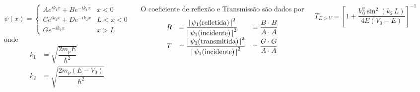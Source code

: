 \documentclass[12pt,brazil,table]{beamer}
\begin{document}
\begin{frame}
\begin{minipage}[b][20ex][t]{\linewidth}
\begin{columns}
      \[
      \psi(x) = \begin{cases}
                  Ae^{ik_1x}+Be^{-ik_1x}& x < 0\\
                  Ce^{ik_2x}+De^{-ik_2x}& L < x < 0\\
                  Ge^{-ik_1x}& x > L
                \end{cases}
        \]
        onde        
        \begin{align*}
            k_1 &= \sqrt{\dfrac{2m_pE}{\hbar^2}}\\
            k_2 &= \sqrt{\dfrac{2m_p\left( E - V_0 \right)}{\hbar^2}}
          \end{align*}
        
        
        O coeficiente de reflexão e Transmissão são dados por
        \[
        \begin{array}[0.8]{lll}
          R &= \dfrac{\left|\, \psi_1 (\text{refletida}) \, \right|^2}{\left|\, \psi_1 (\text{incidente}) \, \right|^2} &= \dfrac{B\cdot B}{A\cdot A}\\
          T &= \dfrac{\left|\, \psi_1 (\text{transmitida}) \, \right|^2}{\left|\, \psi_1 (\text{incidente}) \, \right|^2} &= \dfrac{G\cdot G}{A\cdot A}\\
        \end{array}
        \]
        
        \[
         T_{E>V}= \left[1 + \dfrac{V_0^2\sin^2 \left(k_2\,L \right)}{4E\left(V_0-E\right)}\right]^{-1}
        \]

      
        \end{columns}
    \end{minipage}


\end{frame}

  
\end{document}
